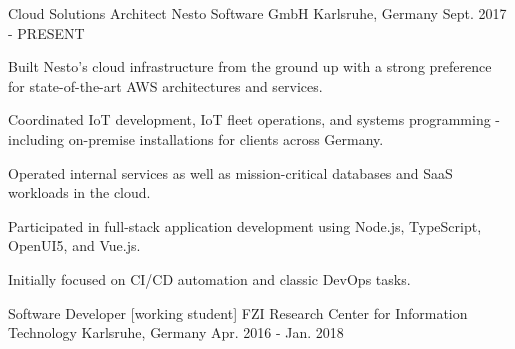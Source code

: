 

\begin{cventries}

\cventry
{Cloud Solutions Architect} %
{Nesto Software GmbH} %
{Karlsruhe, Germany} %
{Sept. 2017 - PRESENT} %
{
  \begin{cvitems} %
    \item {Built Nesto's cloud infrastructure from the ground up with a strong preference for state-of-the-art AWS architectures and services.}
    \item {Coordinated IoT development, IoT fleet operations, and systems programming - including on-premise installations for clients across Germany.}
    \item {Operated internal services as well as mission-critical databases and SaaS workloads in the cloud.}
    \item {Participated in full-stack application development using Node.js, TypeScript, OpenUI5, and Vue.js.}
    \item {Initially focused on CI/CD automation and classic DevOps tasks.}
  \end{cvitems}
}

\cventry
{Software Developer [working student]} %
{FZI Research Center for Information Technology} %
{Karlsruhe, Germany} %
{Apr. 2016 - Jan. 2018} %
{
  \begin{cvitems} %
  \end{cvitems}
}


\end{cventries}
